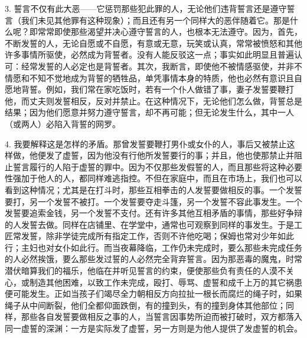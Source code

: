 3. 誓言不仅有此大恶——它惩罚那些犯此罪的人，无论他们违背誓言还是遵守誓言（我们未见其他罪有这种现象）；而且还有另一个同样大的恶伴随着它。那是什么呢？即常常即使那些渴望并决心遵守誓言的人，也根本无法遵守。因为，首先，不断发誓的人，无论自愿或不自愿，有意或无意，玩笑或认真，常常被愤怒和其他许多事情所驱使，必然成为背誓者。没有人能反驳这一点；事实如此明显且普遍认可：经常发誓的人必定也是背誓者。其次，我断言，即使他不被情感驱使，并非不情愿和不知不觉地成为背誓的牺牲品，单凭事情本身的特质，他也必然有意识且自愿地背誓。例如，我们常在家吃饭时，若有一个仆人做错了事，妻子发誓要鞭打他，而丈夫则发誓相反，反对并禁止。在这种情况下，无论他们怎么做，背誓总是结果；因为他们愿意并努力遵守誓言，却不再可能；但无论发生什么，其中一人（或两人）必陷入背誓的网罗。\par

4. 我要解释这是怎样的矛盾。那曾发誓要鞭打男仆或女仆的人，事后又被禁止这样做，他便发了虚誓，因为他没有行他所发誓要行的事；并且，他也使那禁止并阻止誓言履行的人陷于虚誓的罪中。因为不仅那些发假誓的人，而且那些将这种必要性强加于他人的人，都同样难逃指控。不但在家庭中，而且在市场上，我们也可以看到这种情况；尤其是在打斗时，那些互相拳击的人发誓要做相反的事。一个发誓要打，另一个发誓不被打。一个发誓要夺走斗篷，另一个发誓不容此事发生。一个发誓要追索金钱，另一个发誓不支付。还有许多其他互相矛盾的事情，那些好争辩的人发誓去做。同样在店铺里、在学堂中，通常也可观察到同样的事发生。于是工匠常发誓，除非学徒完成所有指定工作，否则不许他吃喝；保姆也常对少年如此行；主妇也对女仆如此行。而当夜幕降临，工作仍未完成时，要么那些未完成任务的人必然挨饿，要么那些发过誓的人必然完全背弃誓言。因为那恶毒的魔鬼，时常潜伏暗算我们的福乐，他临在并听见誓言的约束，便使那些负有责任的人漠不关心，或制造其他困难，以致工作未完成，殴打、辱骂、虚誓和成千上万的其它祸患便可能发生。正如当孩子们竭尽全力朝相反方向拉扯一根长而腐烂的绳子时，如果绳子从中间断裂，他们全都仰面跌倒，有的撞到头，有的撞到身体其他部位；同样，那些各自发誓要做相反之事的人，当誓言因事势所迫而被打破时，双方都落入同一虚誓的深渊：一方是实际发了虚誓，另一方则是为他人提供了发虚誓的机会。\par

